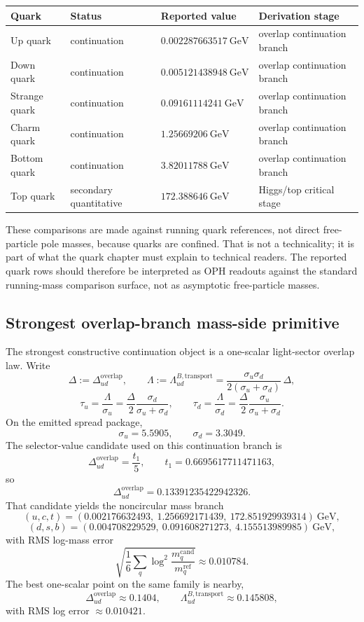 \documentclass[11pt]{article}
\begin{document}
\begin{table}[h]
\centering
\small
\begin{tabular}{@{}llll@{}}
\toprule
Quark & Status & Reported value & Derivation stage \\
\midrule
Up quark & continuation & \(0.002287663517~\mathrm{GeV}\) & overlap continuation branch \\
Down quark & continuation & \(0.005121438948~\mathrm{GeV}\) & overlap continuation branch \\
Strange quark & continuation & \(0.09161114241~\mathrm{GeV}\) & overlap continuation branch \\
Charm quark & continuation & \(1.25669206~\mathrm{GeV}\) & overlap continuation branch \\
Bottom quark & continuation & \(3.82011788~\mathrm{GeV}\) & overlap continuation branch \\
Top quark & secondary quantitative & \(172.388646~\mathrm{GeV}\) & Higgs/top critical stage \\
\bottomrule
\end{tabular}
\end{table}

These comparisons are made against running quark references, not direct free-particle pole
masses, because quarks are confined. That is not a technicality; it is part of what the quark
chapter must explain to technical readers. The reported quark rows should therefore be interpreted
as OPH readouts against the standard running-mass comparison surface, not as
asymptotic free-particle masses.

\subsection{Strongest overlap-branch mass-side primitive}

The strongest constructive continuation object is a one-scalar light-sector overlap law.
Write
\[
\Delta := \Delta_{ud}^{\mathrm{overlap}},
\qquad
\Lambda := \Lambda_{ud}^{B,\mathrm{transport}}
=
\frac{\sigma_u\sigma_d}{2(\sigma_u+\sigma_d)}\,\Delta,
\]
\[
\tau_u
=
\frac{\Lambda}{\sigma_u}
=
\frac{\Delta}{2}\frac{\sigma_d}{\sigma_u+\sigma_d},
\qquad
\tau_d
=
\frac{\Lambda}{\sigma_d}
=
\frac{\Delta}{2}\frac{\sigma_u}{\sigma_u+\sigma_d}.
\]
On the emitted spread package,
\[
\sigma_u = 5.5905,
\qquad
\sigma_d = 3.3049.
\]
The selector-value candidate used on this continuation branch is
\[
\Delta_{ud}^{\mathrm{overlap}}
=
\frac{t_1}{5},
\qquad
t_1 = 0.6695617711471163,
\]
so
\[
\Delta_{ud}^{\mathrm{overlap}} = 0.13391235422942326.
\]
That candidate yields the noncircular mass branch
\[
(u,c,t)
=
(0.002176632493,\ 1.256692171439,\ 172.851929939314)\ \mathrm{GeV},
\]
\[
(d,s,b)
=
(0.004708229529,\ 0.091608271273,\ 4.155513989985)\ \mathrm{GeV},
\]
with RMS log-mass error
\[
\sqrt{\frac16\sum_q \log^2\!\frac{m_q^{\mathrm{cand}}}{m_q^{\mathrm{ref}}}}
\approx
0.010784.
\]
The best one-scalar point on the same family is nearby,
\[
\Delta_{ud}^{\mathrm{overlap}} \approx 0.1404,
\qquad
\Lambda_{ud}^{B,\mathrm{transport}} \approx 0.145808,
\]
with RMS log error \(\approx 0.010421\).
\end{document}
